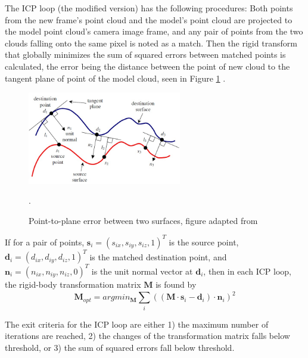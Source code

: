 The ICP loop (the modified version) has the following procedures:  Both points from the new frame's point cloud and the model's point cloud are projected to the model point cloud's camera image frame, and any pair of points from the two clouds falling onto the same pixel is noted as a match.  Then the rigid transform that globally minimizes the sum of squared errors between matched points is calculated, the error being the distance between the point of new cloud to the tangent plane of point of the model cloud, seen in Figure \ref{fig:pointToPlaneError} \cite{low2004linear}.
\begin{figure} [h]
	\centering
	\includegraphics[width=0.6\textwidth]{./img/point_to_plane_error.jpg}
	\caption{Point-to-plane error between two surfaces, figure adapted from \cite{low2004linear}}.
	\label{fig:pointToPlaneError}
\end{figure}


If for a pair of points, \( \textbf{s}_i = (s_{ix}, s_{iy}, s_{iz}, 1)^T \) is the source point, \( \textbf{d}_i = (d_{ix}, d_{iy}, d_{iz}, 1)^T \) is the matched destination point, and \( \textbf{n}_i = (n_{ix}, n_{iy}, n_{iz}, 0)^T \) is the unit normal vector at \( \textbf{d}_i \), then in each ICP loop, the rigid-body transformation matrix \( \textbf{M} \) is found by
\[  \textbf{M}_{opt} = arg min_\textbf{M} \sum_{i}^{} ((\textbf{M} \cdot \textbf{s}_i - \textbf{d}_i) \cdot \textbf{n}_i)^2  \]

The exit criteria for the ICP loop are either 1) the maximum number of iterations are reached, 2) the changes of the transformation matrix falls below threshold, or 3) the sum of squared errors fall below threshold.

